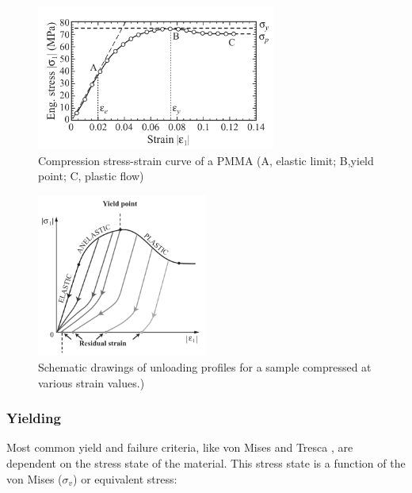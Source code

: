 \begin{figure}[htb]
    \centering
    \includegraphics[width=0.7\textwidth]{chapter_2/figures/SSPMMA.png}
    \caption{Compression stress-strain curve of a PMMA (A, elastic limit; B,yield point; C, plastic flow)\cite{Halary2011PolymerMaterials}}
    \label{fig:SSPMMA}
   \end{figure}
\begin{figure}[htb]
    \centering
    \includegraphics[width=0.5\textwidth]{chapter_2/figures/SSresidual.png}
    \caption{Schematic drawings of unloading profiles for a sample compressed at various strain values.)\cite{Halary2011PolymerMaterials}}
    \label{fig:SSresidual}
   \end{figure}
\subsubsection{Yielding}
Most common yield and failure criteria, like von Mises and Tresca \cite{Christensen2013TheFailure}, are dependent on the stress state of the material. This stress state is a function of the von Mises ($\sigma_v$) or equivalent stress:

